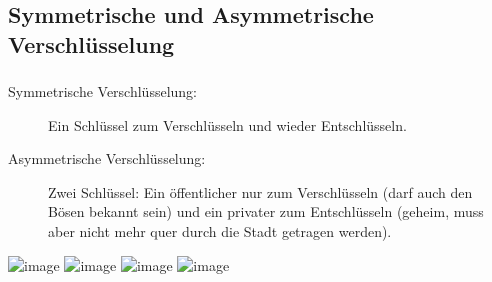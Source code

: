 \documentclass[compress]{beamer}
\begin{document}
\subsection{Symmetrische und Asymmetrische Verschlüsselung}
\begin{frame}
  \frametitle{\insertsubsection}
  \begin{overprint}
    \begin{description}
    \item[Symmetrische Verschlüsselung:] \alert{Ein} Schlüssel
      zum Verschlüsseln und wieder Entschlüsseln.
      
    \end{description}
    \begin{description}
    \item[Asymmetrische Verschlüsselung:] Zwei Schlüssel: Ein
      \alert{öffentlicher} nur zum Verschlüsseln (darf auch den Bösen
      bekannt sein) und ein \alert{privater} zum Entschlüsseln
      (geheim, muss aber nicht mehr quer durch die Stadt getragen
      werden).
    \end{description}
  \end{overprint}
  \vspace{1em}
  \begin{overlayarea}{\columnwidth}{8em}
    \includegraphics<2>[width=\columnwidth]{bilder/symmetric_schluessel.png}
    \includegraphics<3>[width=\columnwidth]{bilder/symmetric_text.png}
    \includegraphics<6>[width=\columnwidth]{%
      bilder/public_key_verfahren_schluessel.png}
    \includegraphics<7>[width=\columnwidth]{%
      bilder/public_key_verfahren_text.png}
  \end{overlayarea}

\end{frame}
\end{document}
